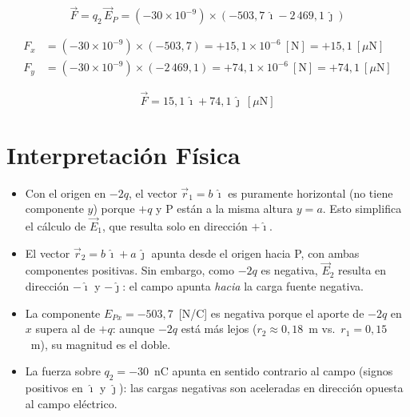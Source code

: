 \documentclass[12pt,letterpaper]{article}
\begin{document}
\[
    \vec{F} = q_2\,\vec{E}_P
    = (-30\times10^{-9})\times\left(-503{,}7\,\hat{\imath} - 2\,469{,}1\,\hat{\jmath}\right)
\]

\begin{align*}
    F_x &= (-30\times10^{-9})\times(-503{,}7) = +15{,}1\times10^{-6}\ [\text{N}] = +15{,}1\ [\mu\text{N}]\\[4pt]
    F_y &= (-30\times10^{-9})\times(-2\,469{,}1) = +74{,}1\times10^{-6}\ [\text{N}] = +74{,}1\ [\mu\text{N}]
\end{align*}

\[
    \boxed{\vec{F} = 15{,}1\,\hat{\imath} + 74{,}1\,\hat{\jmath}\ [\mu\text{N}]}
\]

\section*{Interpretaci\'on F\'isica}

\begin{itemize}
    \item Con el origen en $-2q$, el vector $\vec{r}_1 = b\,\hat{\imath}$ es puramente
    horizontal (no tiene componente $y$) porque $+q$ y P est\'an a la misma altura $y = a$.
    Esto simplifica el c\'alculo de $\vec{E}_1$, que resulta solo en direcci\'on
    $+\hat{\imath}$.

    \item El vector $\vec{r}_2 = b\,\hat{\imath} + a\,\hat{\jmath}$ apunta desde el
    origen hacia P, con ambas componentes positivas. Sin embargo, como $-2q$ es negativa,
    $\vec{E}_2$ resulta en direcci\'on $-\hat{\imath}$ y $-\hat{\jmath}$: el campo
    apunta \textit{hacia} la carga fuente negativa.

    \item La componente $E_{Px} = -503{,}7$~[N/C] es negativa porque el aporte de
    $-2q$ en $x$ supera al de $+q$: aunque $-2q$ est\'a m\'as lejos ($r_2 \approx 0{,}18$~m
    vs.\ $r_1 = 0{,}15$~m), su magnitud es el doble.

    \item La fuerza sobre $q_2 = -30$~nC apunta en sentido contrario al campo
    (signos positivos en $\hat{\imath}$ y $\hat{\jmath}$): las cargas negativas son
    aceleradas en direcci\'on opuesta al campo el\'ectrico.
\end{itemize}
\end{document}
